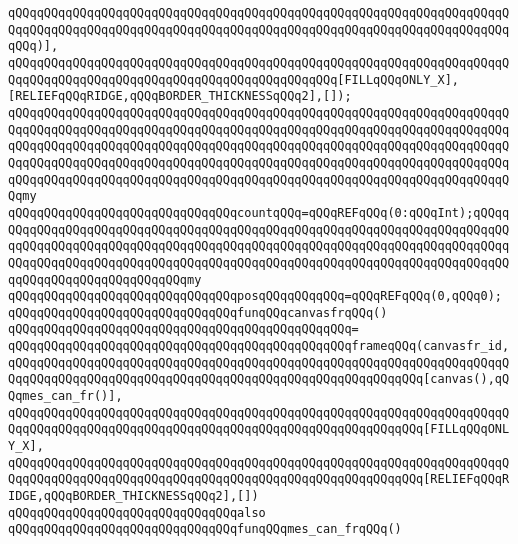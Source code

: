 \verb|qQQqqQQqqQQqqQQqqQQqqQQqqQQqqQQqqQQqqQQqqQQqqQQqqQQqqQQqqQQqqQQqqQQqqQQqqQQqqQQqqQQqqQQqqQQqqQQqqQQqqQQqqQQqqQQqqQQqqQQqqQQqqQQqqQQqqQQqqQQqqQQq)],|\newline
\verb|qQQqqQQqqQQqqQQqqQQqqQQqqQQqqQQqqQQqqQQqqQQqqQQqqQQqqQQqqQQqqQQqqQQqqQQqqQQqqQQqqQQqqQQqqQQqqQQqqQQqqQQqqQQqqQQqqQQq[FILLqQQqONLY_X],[RELIEFqQQqRIDGE,qQQqBORDER_THICKNESSqQQq2],[]);|\newline
\verb|qQQqqQQqqQQqqQQqqQQqqQQqqQQqqQQqqQQqqQQqqQQqqQQqqQQqqQQqqQQqqQQqqQQqqQQqqQQqqQQqqQQqqQQqqQQqqQQqqQQqqQQqqQQqqQQqqQQqqQQqqQQqqQQqqQQqqQQqqQQqqQQqqQQqqQQqqQQqqQQqqQQqqQQqqQQqqQQqqQQqqQQqqQQqqQQqqQQqqQQqqQQqqQQqqQQqqQQqqQQqqQQqqQQqqQQqqQQqqQQqqQQqqQQqqQQqqQQqqQQqqQQqqQQqqQQqqQQqqQQqqQQqqQQqqQQqqQQqqQQqqQQqqQQqqQQqqQQqqQQqqQQqqQQqqQQqqQQqqQQqqQQqqQQqqQQqmy|\newline
\verb|qQQqqQQqqQQqqQQqqQQqqQQqqQQqqQQqcountqQQq=qQQqREFqQQq(0:qQQqInt);qQQqqQQqqQQqqQQqqQQqqQQqqQQqqQQqqQQqqQQqqQQqqQQqqQQqqQQqqQQqqQQqqQQqqQQqqQQqqQQqqQQqqQQqqQQqqQQqqQQqqQQqqQQqqQQqqQQqqQQqqQQqqQQqqQQqqQQqqQQqqQQqqQQqqQQqqQQqqQQqqQQqqQQqqQQqqQQqqQQqqQQqqQQqqQQqqQQqqQQqqQQqqQQqqQQqqQQqqQQqqQQqqQQqqQQqqQQqqQQqmy|\newline
\verb|qQQqqQQqqQQqqQQqqQQqqQQqqQQqqQQqposqQQqqQQqqQQq=qQQqREFqQQq(0,qQQq0);|\newline
\newline
\verb|qQQqqQQqqQQqqQQqqQQqqQQqqQQqqQQqfunqQQqcanvasfrqQQq()|\newline
\verb|qQQqqQQqqQQqqQQqqQQqqQQqqQQqqQQqqQQqqQQqqQQqqQQq=|\newline
\verb|qQQqqQQqqQQqqQQqqQQqqQQqqQQqqQQqqQQqqQQqqQQqqQQqframeqQQq(canvasfr_id,|\newline
\verb|qQQqqQQqqQQqqQQqqQQqqQQqqQQqqQQqqQQqqQQqqQQqqQQqqQQqqQQqqQQqqQQqqQQqqQQqqQQqqQQqqQQqqQQqqQQqqQQqqQQqqQQqqQQqqQQqqQQqqQQqqQQqqQQq[canvas(),qQQqmes_can_fr()],|\newline
\verb|qQQqqQQqqQQqqQQqqQQqqQQqqQQqqQQqqQQqqQQqqQQqqQQqqQQqqQQqqQQqqQQqqQQqqQQqqQQqqQQqqQQqqQQqqQQqqQQqqQQqqQQqqQQqqQQqqQQqqQQqqQQqqQQq[FILLqQQqONLY_X],|\newline
\verb|qQQqqQQqqQQqqQQqqQQqqQQqqQQqqQQqqQQqqQQqqQQqqQQqqQQqqQQqqQQqqQQqqQQqqQQqqQQqqQQqqQQqqQQqqQQqqQQqqQQqqQQqqQQqqQQqqQQqqQQqqQQqqQQq[RELIEFqQQqRIDGE,qQQqBORDER_THICKNESSqQQq2],[])|\newline
\newline
\verb|qQQqqQQqqQQqqQQqqQQqqQQqqQQqqQQqalso|\newline
\verb|qQQqqQQqqQQqqQQqqQQqqQQqqQQqqQQqfunqQQqmes_can_frqQQq()|\newline

